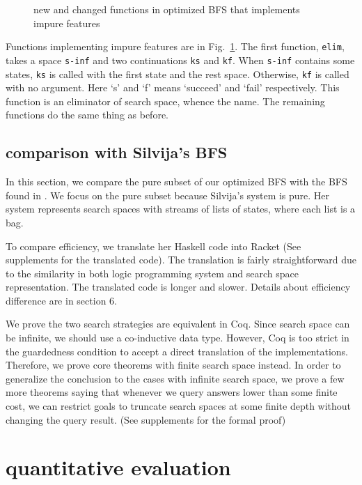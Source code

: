 \documentclass[format=acmlarge, review=true, authordraft=true]{acmart}
\begin{document}
\begin{figure}
		
	\caption{new and changed functions in optimized BFS that implements impure 
		features}
	\label{BFS-opt-cont}
\end{figure}

Functions implementing impure features are in Fig.~\ref{BFS-opt-cont}. The 
first function, \texttt{elim}, takes a space \texttt{s-inf} and two 
continuations \texttt{ks} and \texttt{kf}. When \texttt{s-inf} contains some 
states, \texttt{ks} is called with the first state and the rest space. 
Otherwise, \texttt{kf} is called with no argument. Here `s' and `f' means 
`succeed' and `fail' respectively. This function is an eliminator of search 
space, whence the name. The remaining functions do the same thing as before.

\subsection{comparison with Silvija's BFS}

In this section, we compare the pure subset of our optimized BFS with the BFS 
found in \citep{seres1999algebra}. We focus on the pure subset because 
Silvija's system is pure. Her system represents search spaces with streams of 
lists of states, where each list is a bag.

To compare efficiency, we translate her Haskell code into Racket (See 
supplements for the translated code). The translation is fairly straightforward 
due to the similarity in both logic programming system and search space 
representation. The translated code is longer and slower. Details about 
efficiency difference are in section 6.

We prove the two search strategies are equivalent in Coq. Since search space 
can be infinite, we should use a co-inductive data type. However, Coq is too 
strict in the guardedness condition to accept a direct translation of the 
implementations. Therefore, we prove core theorems with finite search space 
instead. In order to generalize the conclusion to the cases with infinite 
search space, we prove a few more theorems saying that whenever we query 
answers lower than some finite cost, we can restrict goals to truncate search 
spaces at some finite depth without changing the query result. (See supplements 
for the formal proof)

\section{quantitative evaluation}
\end{document}
